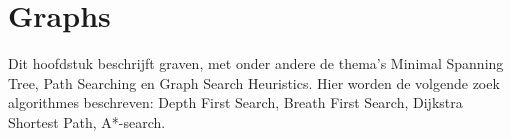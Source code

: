 \section{Graphs}
Dit hoofdstuk beschrijft graven, met onder andere de thema's Minimal Spanning Tree, Path Searching en Graph Search Heuristics.
Hier worden de volgende zoek algorithmes beschreven: Depth First Search, Breath First Search, Dijkstra Shortest Path, A*-search.
